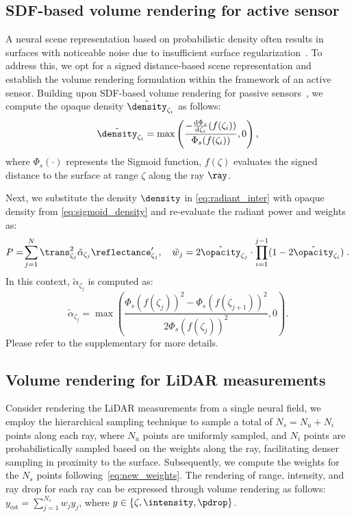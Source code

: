 \subsection{SDF-based volume rendering for active sensor} \label{sec:sdf_vol_render}
A neural scene representation based on probabilistic density often results in surfaces with noticeable noise due to insufficient surface regularization~\cite{wang2021neus}. To address this, we opt for a signed distance-based scene representation and establish the volume rendering formulation within the framework of an active sensor. Building upon SDF-based volume rendering for passive sensors~\cite{wang2021neus}, we compute the opaque density $\tilde{\density}_{\zeta_i}$ as follows:
\begin{equation}
\tilde{\density}_{\zeta_i} = \max\left(\frac{-\frac{{\textrm{d}}\Phi_s}{{\textrm{d}} \zeta_i}(f(\zeta_i))}{\Phi_s(f(\zeta_i))},0\right),
\label{eq:sigmoid_density}
\end{equation}
where $\Phi_s(\cdot)$ represents the Sigmoid function, $f(\zeta)$ evaluates the signed distance to the surface at range $\zeta$ along the ray $\ray$. 

Next, we substitute the density $\density$ in \cref{eq:radiant_inter} with opaque density from \cref{eq:sigmoid_density} and re-evaluate the radiant power and weights as:
\begin{equation}
      P
      =\!\sum_{j=1}^N \trans^2_{\zeta_j} \tilde{\alpha}_{\zeta_j} \reflectance_{\zeta_j}',\quad \tilde{w}_j = 2 \tilde{\opacity}_{\zeta_j} \cdot\prod_{i=1}^{j-1}(1 - 2 \tilde{\opacity}_{\zeta_i})\;.
\end{equation}
In this context, $\tilde{\alpha}_{\zeta_j}$ is computed as:
\begin{equation}
    \tilde{\alpha}_{\zeta_j} = \max\left(\!\frac{{\Phi_s(f(\zeta_j))}^2 -{\Phi_s(f(\zeta_{j+1}))}^2}{{2\Phi_s(f(\zeta_j))}^2},0\right).
    \label{eq:new_weights}
\end{equation}
Please refer to the supplementary for more details.


\subsection{Volume rendering for LiDAR measurements}\label{sec:dynamic_nfl_rendering}
Consider rendering the LiDAR measurements from a single neural field, we employ the hierarchical sampling\cite{wang2021neus} technique to sample a total of $N_s= N_u + N_i$ points along each ray, where $N_u$ points are uniformly sampled, and $N_i$ points are probabilistically sampled based on the weights along the ray, facilitating denser sampling in proximity to the surface. Subsequently, we compute the weights for the $N_s$ points following~\cref{eq:new_weights}. The rendering of range, intensity, and ray drop for each ray can be expressed through volume rendering as follows: $y_\text{est} = \sum_{j=1}^{N_s} w_j y_j$, where $y \in \{\zeta, \intensity, \pdrop\}$.


